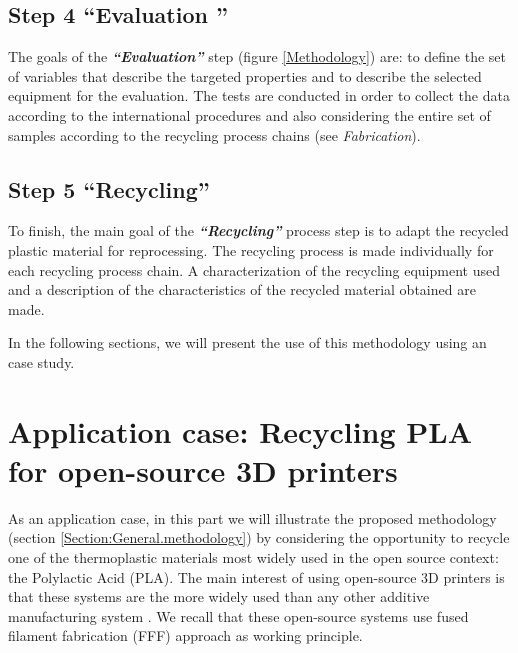 	\subsection{ Step 4 ``Evaluation ''}
	
	The goals of the \textit{\textbf{``Evaluation''}} step (figure \ref{Methodology})  are:
	to define the set of variables that describe the targeted properties 	and to describe the selected equipment for the evaluation.
	The tests are conducted in order to collect the data according to the international procedures and also considering the entire set of samples according to the recycling process chains (see \textit{Fabrication}).



\subsection{ Step 5 ``Recycling''}
To finish,	the main goal of the  \textit{\textbf{``Recycling''}} process step is to adapt the recycled plastic material for reprocessing.
The recycling process is made individually for each recycling process chain.
A characterization of the recycling equipment used and a description of the characteristics of the recycled material obtained are made. 






In the following sections, we will present the use of this methodology using an case study.

\section{Application case: Recycling PLA for open-source 3D printers}
\label{Section:Application.case}

As an application case, in this part we will illustrate the proposed methodology  (section \ref{Section:General.methodology}) by considering the opportunity to recycle one of the thermoplastic materials most widely  used in the open source context: the Polylactic Acid (PLA).
The main interest of using open-source 3D printers is that these systems are the more widely used than any other additive manufacturing system  \parencite{Ford2014}.
We recall that these open-source systems use fused filament fabrication (FFF) approach as working principle.


